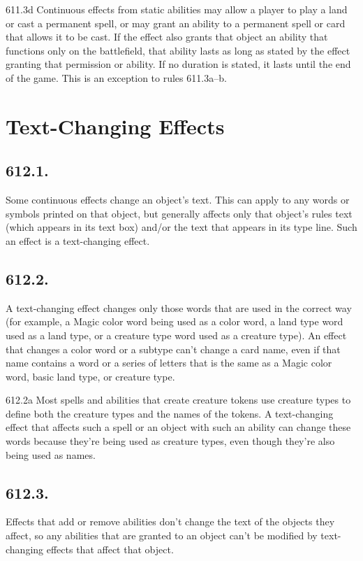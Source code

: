 611.3d Continuous effects from static abilities may allow a player to play a land or cast a permanent spell, or may grant an ability to a permanent spell or card that allows it to be cast. If the effect also grants that object an ability that functions only on the battlefield, that ability lasts as long as stated by the effect granting that permission or ability. If no duration is stated, it lasts until the end of the game. This is an exception to rules 611.3a–b.

\section{Text-Changing Effects}
\subsection*{612.1.}
Some continuous effects change an object’s text. This can apply to any words or symbols printed on that object, but generally affects only that object’s rules text (which appears in its text box) and/or the text that appears in its type line. Such an effect is a text-changing effect.

\subsection*{612.2.}
A text-changing effect changes only those words that are used in the correct way (for example, a Magic color word being used as a color word, a land type word used as a land type, or a creature type word used as a creature type). An effect that changes a color word or a subtype can’t change a card name, even if that name contains a word or a series of letters that is the same as a Magic color word, basic land type, or creature type.

612.2a Most spells and abilities that create creature tokens use creature types to define both the creature types and the names of the tokens. A text-changing effect that affects such a spell or an object with such an ability can change these words because they’re being used as creature types, even though they’re also being used as names.

\subsection*{612.3.}
Effects that add or remove abilities don’t change the text of the objects they affect, so any abilities that are granted to an object can’t be modified by text-changing effects that affect that object.

